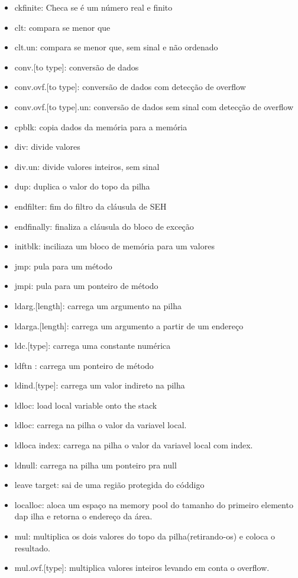 \documentclass{article}
\begin{document}
\begin{itemize}
\item ckfinite: Checa se é um número real e finito
\item clt: compara se menor que
\item clt.un: compara se menor que, sem sinal e não ordenado
\item conv.[to type]: conversão de dados
\item conv.ovf.[to type]: conversão de dados com detecção de overflow
\item conv.ovf.[to type].un: conversão de dados sem sinal com detecção de
overflow
\item cpblk: copia dados da memória para a memória
\item div: divide valores
\item div.un: divide valores inteiros, sem sinal
\item dup: duplica o valor do topo da pilha
\item endfilter: fim do filtro da cláusula de SEH
\item endfinally: finaliza a cláusula do bloco de exceção
\item initblk: inciliaza um bloco de memória para um valores
\item jmp: pula para um método
\item jmpi: pula para um ponteiro de método
\item ldarg.[length]: carrega um argumento na pilha
\item ldarga.[length]: carrega um argumento a partir de um endereço
\item ldc.[type]: carrega uma constante numérica
\item ldftn : carrega um ponteiro de método
\item ldind.[type]: carrega um valor indireto na pilha
\item ldloc: load local variable onto the stack
\item ldloc: carrega na pilha o valor da variavel local.
\item ldloca index: carrega na pilha o valor da variavel local com index.
\item ldnull: carrega na pilha um ponteiro pra null
\item leave target: sai de uma região protegida do códdigo
\item localloc: aloca um espaço na memory pool do tamanho do primeiro
elemento dap ilha e retorna o endereço da área.
\item mul: multiplica os dois valores do topo da pilha(retirando-os) e coloca
o resultado.
\item mul.ovf.[type]: multiplica valores inteiros levando em conta o overflow.

\end{itemize}
\end{document}
